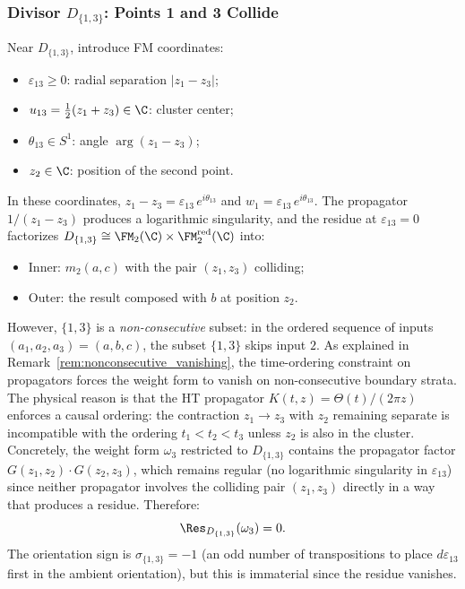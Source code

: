 \subsubsection{Divisor $D_{\{1,3\}}$: Points 1 and 3 Collide}

\begin{computation}[$D_{\{1,3\}}$ residue]
\label{comp:D13}
Near $D_{\{1,3\}}$, introduce FM coordinates:
\begin{itemize}
\item $\varepsilon_{13} \geq 0$: radial separation $|z_1 - z_3|$;
\item $u_{13} = \tfrac{1}{2}(z_1 + z_3) \in \C$: cluster center;
\item $\theta_{13} \in S^1$: angle $\arg(z_1 - z_3)$;
\item $z_2 \in \C$: position of the second point.
\end{itemize}
In these coordinates, $z_1 - z_3 = \varepsilon_{13}\, e^{i\theta_{13}}$ and $w_1 = \varepsilon_{13}\, e^{i\theta_{13}}$. The propagator $1/(z_1 - z_3)$ produces a logarithmic singularity, and the residue at $\varepsilon_{13} = 0$ factorizes $D_{\{1,3\}} \cong \FM_2(\C) \times \FM_2^{\mathrm{red}}(\C)$ into:
\begin{itemize}
\item Inner: $m_2(a, c)$ with the pair $(z_1, z_3)$ colliding;
\item Outer: the result composed with $b$ at position $z_2$.
\end{itemize}
However, $\{1,3\}$ is a \emph{non-consecutive} subset: in the ordered sequence of inputs $(a_1, a_2, a_3) = (a, b, c)$, the subset $\{1,3\}$ skips input $2$. As explained in Remark~\ref{rem:nonconsecutive_vanishing}, the time-ordering constraint on propagators forces the weight form to vanish on non-consecutive boundary strata. The physical reason is that the HT propagator $K(t,z) = \Theta(t)/(2\pi z)$ enforces a causal ordering: the contraction $z_1 \to z_3$ with $z_2$ remaining separate is incompatible with the ordering $t_1 < t_2 < t_3$ unless $z_2$ is also in the cluster. Concretely, the weight form $\omega_3$ restricted to $D_{\{1,3\}}$ contains the propagator factor $G(z_1, z_2) \cdot G(z_2, z_3)$, which remains regular (no logarithmic singularity in $\varepsilon_{13}$) since neither propagator involves the colliding pair $(z_1, z_3)$ directly in a way that produces a residue. Therefore:
\[
\Res_{D_{\{1,3\}}}(\omega_3) = 0.
\]
The orientation sign is $\sigma_{\{1,3\}} = -1$ (an odd number of transpositions to place $d\varepsilon_{13}$ first in the ambient orientation), but this is immaterial since the residue vanishes.
\end{computation}

